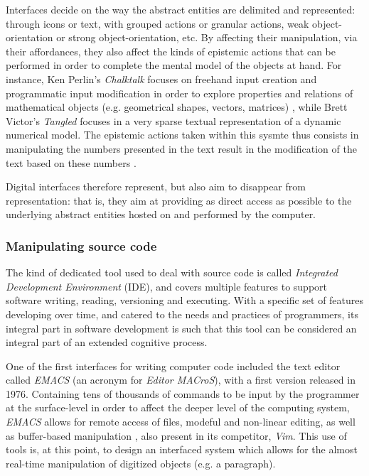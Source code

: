 Interfaces decide on the way the abstract entities are delimited and represented: through icons or text, with grouped actions or granular actions, weak object-orientation or strong object-orientation, etc. By affecting their manipulation, via their affordances, they also affect the kinds of epistemic actions that can be performed in order to complete the mental model of the objects at hand. For instance, Ken Perlin's \emph{Chalktalk} focuses on freehand input creation and programmatic input modification in order to explore properties and relations of mathematical objects (e.g. geometrical shapes, vectors, matrices) \citep{perlin_chalktalk_2022}, while Brett Victor's \emph{Tangled} focuses in a very sparse textual representation of a dynamic numerical model. The epistemic actions taken within this sysmte thus consists in manipulating the numbers presented in the text result in the modification of the text based on these numbers \citep{victor_tangle_2011,victor_explorable_2011}.

Digital interfaces therefore represent, but also aim to disappear from representation: that is, they aim at providing as direct access as possible to the underlying abstract entities hosted on and performed by the computer.

\subsubsection{Manipulating source code}

The kind of dedicated tool used to deal with source code is called \emph{Integrated Development Environment} (IDE), and covers multiple features to support software writing, reading, versioning and executing. With a specific set of features developing over time, and catered to the needs and practices of programmers, its integral part in software development is such that this tool can be considered an integral part of an extended cognitive process.

One of the first interfaces for writing computer code included the text editor called \emph{EMACS} (an acronym for \emph{Editor MACroS}), with a first version released in 1976. Containing tens of thousands of commands to be input by the programmer at the surface-level in order to affect the deeper level of the computing system, \emph{EMACS} allows for remote access of files, modeful and non-linear editing, as well as buffer-based manipulation \citep{greenberg_multics_1996}, also present in its competitor, \emph{Vim}. This use of tools is, at this point, to design an interfaced system which allows for the almost real-time manipulation of digitized objects (e.g. a paragraph).

